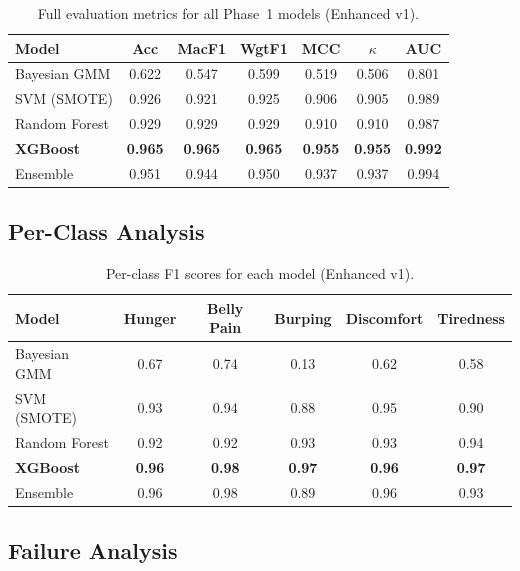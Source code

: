 \documentclass[11pt,a4paper]{article}
\begin{document}
\begin{table}[H]
\centering
\caption{Full evaluation metrics for all Phase~1 models (Enhanced v1).}
\label{tab:results_full}
\begin{tabular}{lcccccc}
\toprule
\textbf{Model} & \textbf{Acc} & \textbf{MacF1} & \textbf{WgtF1} & \textbf{MCC} & \textbf{$\kappa$} & \textbf{AUC} \\
\midrule
Bayesian GMM   & 0.622 & 0.547 & 0.599 & 0.519 & 0.506 & 0.801 \\
SVM (SMOTE)    & 0.926 & 0.921 & 0.925 & 0.906 & 0.905 & 0.989 \\
Random Forest  & 0.929 & 0.929 & 0.929 & 0.910 & 0.910 & 0.987 \\
\textbf{XGBoost} & \textbf{0.965} & \textbf{0.965} & \textbf{0.965} & \textbf{0.955} & \textbf{0.955} & \textbf{0.992} \\
Ensemble       & 0.951 & 0.944 & 0.950 & 0.937 & 0.937 & 0.994 \\
\bottomrule
\end{tabular}
\end{table}

\subsection{Per-Class Analysis}

\begin{table}[H]
\centering
\caption{Per-class F1 scores for each model (Enhanced v1).}
\label{tab:perclass}
\begin{tabular}{lccccc}
\toprule
\textbf{Model} & \textbf{Hunger} & \textbf{Belly Pain} & \textbf{Burping} & \textbf{Discomfort} & \textbf{Tiredness} \\
\midrule
Bayesian GMM   & 0.67 & 0.74 & 0.13 & 0.62 & 0.58 \\
SVM (SMOTE)    & 0.93 & 0.94 & 0.88 & 0.95 & 0.90 \\
Random Forest  & 0.92 & 0.92 & 0.93 & 0.93 & 0.94 \\
\textbf{XGBoost} & \textbf{0.96} & \textbf{0.98} & \textbf{0.97} & \textbf{0.96} & \textbf{0.97} \\
Ensemble       & 0.96 & 0.98 & 0.89 & 0.96 & 0.93 \\
\bottomrule
\end{tabular}
\end{table}

\subsection{Failure Analysis}
\label{sec:failure}
\end{document}
